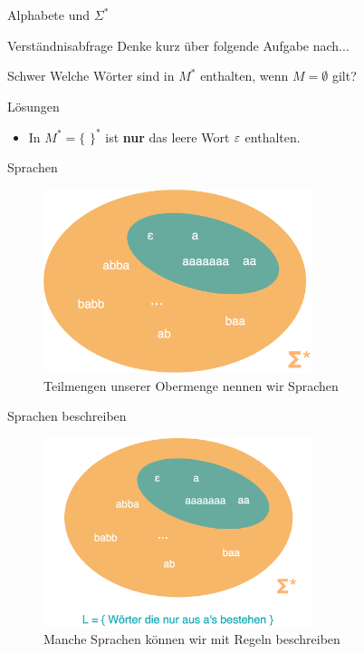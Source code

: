 \begin{frame}[fragile]{Alphabete und $\Sigma^{*}$}
\begin{alertblock}{Verständnisabfrage}
    Denke kurz über folgende Aufgabe nach...
    \end{alertblock}
    
    \begin{block}{Schwer}
        Welche Wörter sind in $M^{*}$ enthalten, wenn $M = \emptyset$ gilt?
    \end{block}
\end{frame}

{
\begin{frame}{Lösungen}
  \begin{itemize}
        \item In $M^{*} = \{$ $ \}^{*}$ ist \textbf{nur} das leere Wort $\varepsilon$ enthalten.
    \end{itemize}
\end{frame}
}

\begin{frame}[fragile]{Sprachen}
\begin{figure}
    \centering
    \includegraphics[width=0.7\textwidth]{../figures/MysterySprache.png}
    \caption{Teilmengen unserer Obermenge nennen wir Sprachen}
    \label{fig:my_label}
\end{figure}
\end{frame}

\begin{frame}[fragile]{Sprachen beschreiben}
\begin{figure}
    \centering
    \includegraphics[width=0.7\textwidth]{../figures/SprachReveal.png}
    \caption{Manche Sprachen können wir mit Regeln beschreiben}
    \label{fig:my_label}
\end{figure}
\end{frame}

